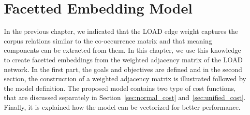 
\chapter{Facetted Embedding Model}\label{chap:main}

In the previous chapter, we indicated that the LOAD edge weight captures the corpus relations similar to the co-occurrence matrix and that meaning components can be extracted from them. In this chapter, we use this knowledge to create facetted embeddings from the weighted adjacency matrix of the LOAD network. In the first part, the goals and objectives are defined and in the second section, the construction of a weighted adjacency matrix is illustrated followed by the model definition. The proposed model contains two type of cost functions, that are discussed separately in Section~\ref{sec:normal_cost} and~\ref{sec:unified_cost}. Finally, it is explained how the model can be vectorized for better performance. 
